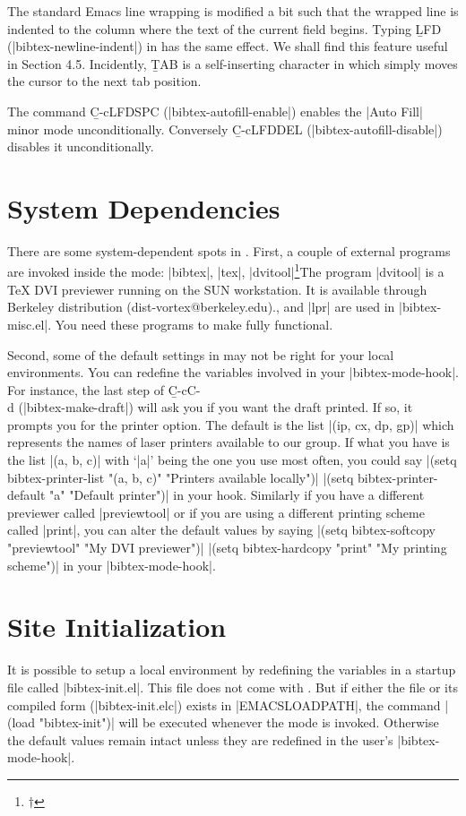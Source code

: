 The standard Emacs line wrapping is modified a bit such that
the wrapped line is indented to the column where the text of the current
field begins.
Typing {\b LFD} (|bibtex-newline-indent|) in {\BM} has the same effect.
We shall find this feature useful in Section 4.5.  Incidently, {\b TAB} is a 
self-inserting character in {\BM} which simply moves the cursor to the next
tab position.

The command {\b C-c{\s}LFD{\s}SPC} (|bibtex-autofill-enable|) enables
the |Auto Fill| minor mode unconditionally.  
Conversely {\b C-c{\s}LFD{\s}DEL} (|bibtex-autofill-disable|) disables it
unconditionally.


\section{System Dependencies}
\noindent

There are some system-dependent spots in {\BM}.
First, a couple of external programs are invoked inside the mode:
|bibtex|, |tex|, |dvitool|\footnote{$\dag$}{The program
|dvitool| is a {\TeX} DVI previewer running on the
SUN workstation.  It is available through 
Berkeley {\VorTeX} distribution (dist-vortex@berkeley.edu).}, and |lpr|
are used in |bibtex-misc.el|.
You need these programs to make {\BM} fully functional.

Second, some of the default settings in {\BM} may not
be right for your local environments.  You can redefine the variables involved
in your |bibtex-mode-hook|.  For instance, the last step of 
{\b C-c{\s}C-\\{\s}d} (|bibtex-make-draft|) will ask you if you want
the draft printed.  If so, it prompts you for the printer option.  
The default is the list |(ip, cx, dp, gp)| which represents the names of 
laser printers available to our group.  If what you have is the list 
|(a, b, c)| with `|a|' being the one you use most often, you could say
\begindisplay
|(setq bibtex-printer-list "(a, b, c)" "Printers available locally")|\cr
|(setq bibtex-printer-default "a" "Default printer")|\cr
\enddisplay
in your hook.  Similarly if you have a different previewer called |previewtool|
or if you are using a different printing scheme called |print|, you can alter
the default values by saying
\begindisplay
|(setq bibtex-softcopy "previewtool" "My DVI previewer")|\cr
|(setq bibtex-hardcopy "print" "My printing scheme")|\cr
\enddisplay
in your |bibtex-mode-hook|.

\section{Site Initialization}
\noindent
It is possible to setup a local {\BM} environment by redefining
the variables in a startup file called \hbox{|bibtex-init.el|}.
This file does not come with
{\BM}.  But if either the file or its compiled form (|bibtex-init.elc|)
exists in |EMACSLOADPATH|, the command
\begindisplay
|(load "bibtex-init")|\cr
\enddisplay
will be executed whenever the mode is invoked.  Otherwise the default
values remain intact unless they are redefined in the user's |bibtex-mode-hook|.

